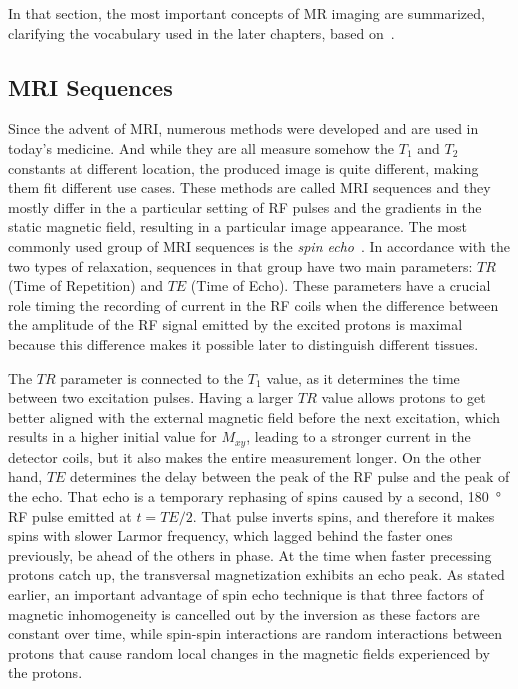 In that section, the most important concepts of MR imaging are summarized, clarifying the vocabulary used in the later chapters, based on~\cite{nishimura_principles_1996, pooley_fundamental_2005}.

\subsection{MRI Sequences}
Since the advent of MRI, numerous methods were developed and are used in today's medicine. And while they are all measure somehow the $T_1$ and $T_2$ constants at different location, the produced image is quite different, making them fit different use cases. These methods are called MRI sequences and they mostly differ in the a particular setting of RF pulses and the gradients in the static magnetic field, resulting in a particular image appearance. The most commonly used group of MRI sequences is the \textit{spin echo}~\cite{hahn_spin_1950}. In accordance with the two types of relaxation, sequences in that group have two main parameters: $TR$ (Time of Repetition) and $TE$ (Time of Echo). These parameters have a crucial role timing the recording of current in the RF coils when the difference between the amplitude of the RF signal emitted by the excited protons is maximal because this difference makes it possible later to distinguish different tissues.

The $TR$ parameter is connected to the $T_1$ value, as it determines the time between two excitation pulses. Having a larger $TR$ value allows protons to get better aligned with the external magnetic field before the next excitation, which results in a higher initial value for $M_{xy}$, leading to a stronger current in the detector coils, but it also makes the entire measurement longer. On the other hand, $TE$ determines the delay between the peak of the RF pulse and the peak of the echo. That echo is a temporary rephasing of spins caused by a second, \SI{180}{\degree} RF pulse emitted at $t = TE/2$. That pulse inverts spins, and therefore it makes spins with slower Larmor frequency, which lagged behind the faster ones previously, be ahead of the others in phase. At the time when faster precessing protons catch up, the transversal magnetization exhibits an echo peak. As stated earlier, an important advantage of spin echo technique is that three factors of magnetic inhomogeneity is cancelled out by the inversion as these factors are constant over time, while spin-spin interactions are random interactions between protons that cause random local changes in the magnetic fields experienced by the protons.

